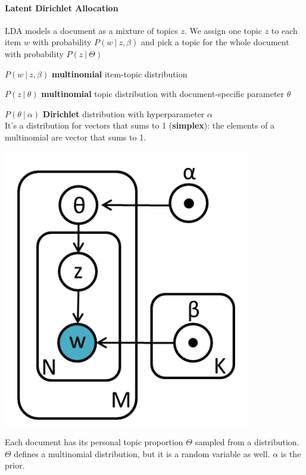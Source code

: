 \documentclass[10pt]{report}
\begin{document}
\paragraph{Latent Dirichlet Allocation} LDA models a document as a mixture of topics $z$. We assign one topic $z$ to each item $w$ with probability $P(w\:|\:z,\beta)$ and pick a topic for the whole document with probability $P(z\:|\:\Theta)$
\begin{multicols}{2}
\begin{list}{}{}
	\item $P(w\:|\:z,\beta)$ \textbf{multinomial} item-topic distribution
	\item $P(z\:|\:\theta)$ \textbf{multinomial} topic distribution with document-specific parameter $\theta$
	\item $P(\theta\:|\:\alpha)$ \textbf{Dirichlet} distribution with hyperparameter $\alpha$\\
	It's a distribution for vectors that sums to 1 (\textbf{simplex}): the elements of a multinomial are vector that sums to 1.
\end{list}
\begin{center}
	\includegraphics[scale=0.45]{40.png}
\end{center}
\end{multicols}
Each document has its personal topic proportion $\Theta$ sampled from a distribution. $\Theta$ defines a multinomial distribution, but it is a random variable as well. $\alpha$ is the prior.
\end{document}
